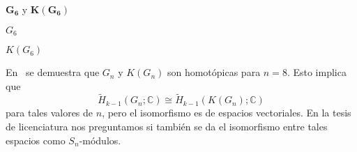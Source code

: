 \documentclass[final,xcolor=svgnames]{beamer}
\begin{document}
\begin{frame}{}
\begin{columns}
\begin{column}{0.5\textwidth}
\begin{block}{$\boldsymbol{G_6}$ y $\boldsymbol{K(G_6)}$}
  \begin{minipage}{0.53\linewidth}    
    \centering

    $G_{6}$
  \end{minipage}
  \begin{minipage}{0.4\linewidth}  
    \centering   

    $K(G_{6})$
  \end{minipage}
\end{block}

\begin{block}{}
  En~\cite{chessboard-graphs} se demuestra que $G_{n}$ y $K(G_{n})$
  son homotópicas para $n=8$. Esto implica que
  \begin{equation*}
    \widetilde H_{k-1}(G_{n};\mathbb{C})\cong \widetilde H_{k-1}(K(G_{n});\mathbb{C})
  \end{equation*}
  para tales valores de $n$, pero el isomorfismo es de espacios
  vectoriales. En la tesis de licenciatura nos preguntamos si también
  se da el isomorfismo entre tales espacios \alert{como $S_{n}$-módulos}.
\end{block}


\end{column}
\end{columns}
\end{frame}
\end{document}
